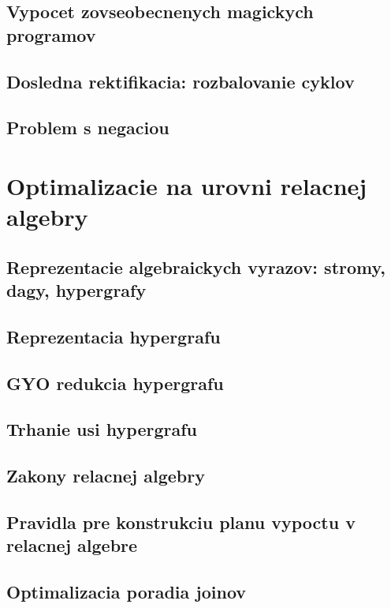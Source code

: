 \documentclass[12pt,a4paper]{article}
\begin{document}
\subsection{Vypocet zovseobecnenych magickych programov}

\subsection{Dosledna rektifikacia: rozbalovanie cyklov}

\subsection{Problem s negaciou}

\section{Optimalizacie na urovni relacnej algebry}

\subsection{Reprezentacie algebraickych vyrazov: stromy, dagy, hypergrafy}

\subsection{Reprezentacia hypergrafu}

\subsection{GYO redukcia hypergrafu}

\subsection{Trhanie usi hypergrafu}

\subsection{Zakony relacnej algebry}

\subsection{Pravidla pre konstrukciu planu vypoctu v relacnej algebre}

\subsection{Optimalizacia poradia joinov}
\end{document}
